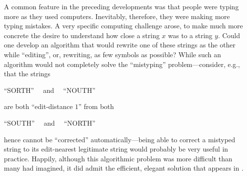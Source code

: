 A common feature in the preceding developments was that people were typing more as they used computers.  Inevitably, therefore, they were making more typing mistakes.  A very specific computing challenge arose, to make much more concrete the desire to understand how close a
string $x$ was to a string $y$.  Could one develop an algorithm that would rewrite one of these strings as the other while ``editing'', or, rewriting, as few symbols as possible?  While such an algorithm would not completely solve the ``mistyping'' problem---consider, e.g., that the strings

\hspace*{.25in} ``SORTH'' \ \ and \ \ ``NOUTH''

\noindent
are both ``edit-distance $1$'' from both

\hspace*{.25in} ``SOUTH'' \ \ and \ \ ``NORTH''

\noindent
hence cannot be ``corrected'' automatically---being able to correct a mistyped string to its edit-nearest legitimate string would probably be very useful in practice.  Happily, although this algorithmic problem was more difficult than many had imagined, it did admit the efficient, elegant solution that appears in \cite{WagnerF74}.
